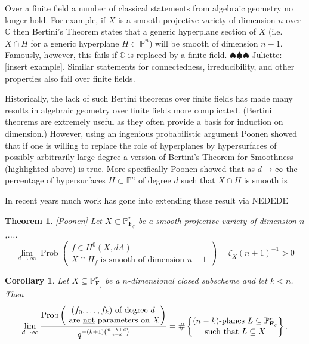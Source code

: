 \documentclass[10pt,reqno]{amsart}
\newtheorem{theorem}[lemma]{Theorem}
\newtheorem{cor}[lemma]{Corollary}
\theoremstyle{remark}
\newcommand{\Prob}{\operatorname{Prob}}
\newcommand{\fF}{\mathbf F}
\newcommand{\C}{\mathbb{C}}
\renewcommand{\P}{\mathbb{P}}
\newcommand{\juliette}[1]{{\color{red} \sf $\spadesuit\spadesuit\spadesuit$ Juliette: [#1]}}
\begin{document}
Over a finite field a number of classical statements from algebraic geometry no longer hold. For example, if $X$ is a smooth projective variety of dimension $n$ over $\C$ then Bertini's Theorem states that a generic hyperplane section of $X$ (i.e. $X\cap H$ for a generic hyperplane $H\subset \P^n$) will be smooth of dimension $n-1$. Famously, however, this fails if $\C$ is replaced by a finite field. \juliette{insert example}. Similar statements for connectedness, irreducibility, and other properties also fail over finite fields. 

Historically, the lack of such Bertini theorems over finite fields has made many results in algebraic geometry over finite fields more complicated. (Bertini theorems are extremely useful as they often provide a basis for induction on dimension.) However, using an ingenious probabilistic argument Poonen showed that if one is willing to replace the role of hyperplanes by hypersurfaces of possibly arbitrarily large degree a version of Bertini's Theorem for Smoothness (highlighted above) is true. More specifically Poonen showed that as $d\to\infty$ the percentage of hypersurfaces $H\subset \P^{n}$ of degree $d$ such that $X\cap H$ is smooth is 

In recent years much work has gone into extending these result via NEDEDE

\begin{theorem}\label{thm:poonen}[Poonen]
Let $X\subset \P^{r}_{\fF_{q}}$ be a smooth projective variety of dimension $n$,....
\begin{equation}
\lim_{d\to \infty} \Prob\left(\begin{matrix} f\in H^0\left(X, dA\right) \\ \text{$X\cap H_{f}$ is smooth of dimension $n-1$}\end{matrix}\right)=
\zeta_X(n+1)^{-1} >0
\end{equation}
\end{theorem}

\begin{cor}\label{cor:error}
Let $X\subseteq \P^r_{\fF_q}$ be a $n$-dimensional closed subscheme and let $k<n$.  Then
\[
\lim_{d\to \infty} \frac{\Prob\left(\begin{matrix}(f_0,\dots,f_{k}) \text{ of degree $d$} \\ \text{ are \underline{not} parameters on $X$}\end{matrix}\right)} {q^{-(k+1)\binom{n-k+d}{n-k}}} = \#\left\{\begin{matrix}\text{$(n-k)$-planes } L\subseteq \P^r_{\fF_q}\\\text{such that }  L\subseteq X\end{matrix}\right\}.
\]
\end{cor} 
\end{document}
